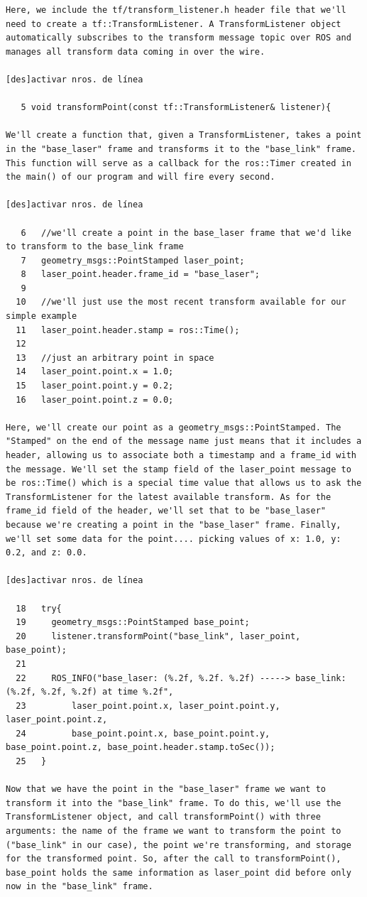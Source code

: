 \begin{verbatim}
Here, we include the tf/transform_listener.h header file that we'll need to create a tf::TransformListener. A TransformListener object automatically subscribes to the transform message topic over ROS and manages all transform data coming in over the wire.

[des]activar nros. de línea

   5 void transformPoint(const tf::TransformListener& listener){

We'll create a function that, given a TransformListener, takes a point in the "base_laser" frame and transforms it to the "base_link" frame. This function will serve as a callback for the ros::Timer created in the main() of our program and will fire every second.

[des]activar nros. de línea

   6   //we'll create a point in the base_laser frame that we'd like to transform to the base_link frame
   7   geometry_msgs::PointStamped laser_point;
   8   laser_point.header.frame_id = "base_laser";
   9 
  10   //we'll just use the most recent transform available for our simple example
  11   laser_point.header.stamp = ros::Time();
  12 
  13   //just an arbitrary point in space
  14   laser_point.point.x = 1.0;
  15   laser_point.point.y = 0.2;
  16   laser_point.point.z = 0.0;

Here, we'll create our point as a geometry_msgs::PointStamped. The "Stamped" on the end of the message name just means that it includes a header, allowing us to associate both a timestamp and a frame_id with the message. We'll set the stamp field of the laser_point message to be ros::Time() which is a special time value that allows us to ask the TransformListener for the latest available transform. As for the frame_id field of the header, we'll set that to be "base_laser" because we're creating a point in the "base_laser" frame. Finally, we'll set some data for the point.... picking values of x: 1.0, y: 0.2, and z: 0.0.

[des]activar nros. de línea

  18   try{
  19     geometry_msgs::PointStamped base_point;
  20     listener.transformPoint("base_link", laser_point, base_point);
  21 
  22     ROS_INFO("base_laser: (%.2f, %.2f. %.2f) -----> base_link: (%.2f, %.2f, %.2f) at time %.2f",
  23         laser_point.point.x, laser_point.point.y, laser_point.point.z,
  24         base_point.point.x, base_point.point.y, base_point.point.z, base_point.header.stamp.toSec());
  25   }

Now that we have the point in the "base_laser" frame we want to transform it into the "base_link" frame. To do this, we'll use the TransformListener object, and call transformPoint() with three arguments: the name of the frame we want to transform the point to ("base_link" in our case), the point we're transforming, and storage for the transformed point. So, after the call to transformPoint(), base_point holds the same information as laser_point did before only now in the "base_link" frame.


\end{verbatim}
